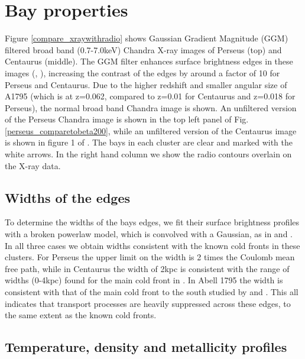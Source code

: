 \documentclass[useAMS,usenatbib]{mn2e}
\begin{document}
\section{Bay properties}
\label{sec:bayproperties}
Figure \ref{compare_xraywithradio} shows Gaussian Gradient
Magnitude (GGM) filtered broad band (0.7-7.0keV) Chandra
X-ray images of Perseus (top) and Centaurus (middle). The GGM filter enhances surface
brightness edges in these images (\citealt{Sanders2016b}, \citealt{Walker2016}), increasing the contrast of the
edges by around a factor of 10 for Perseus and Centaurus. Due to the higher redshift and smaller angular size of A1795 (which is at z=0.062, compared to z=0.01 for Centaurus and z=0.018 for Perseus), the normal broad band Chandra
image is shown. An unfiltered version of the Perseus Chandra image is shown in the top left panel of Fig. \ref{perseus_comparetobeta200}, while an unfiltered version of the
Centaurus image is shown in figure 1 of \citet{Sanders2016}. The bays in each cluster are clear and marked
with the white arrows. In the right hand column we show the radio contours
overlain on the X-ray data. 

\subsection{Widths of the edges}

To determine the widths of the bays edges, we fit their surface brightness profiles with a broken powerlaw
model, which is convolved with a Gaussian, as in \citet{Sanders2016b} and \citet{Walker2016}. In all three cases we obtain
widths consistent with the known cold fronts in these clusters. For Perseus the upper limit on the width is 2 times the Coulomb mean 
free path, while in Centaurus the width of 2kpc is consistent with the range of widths (0-4kpc) found for the main cold front in \citealt{Sanders2016b}. In Abell 1795 the width is consistent with that of the main cold front to the south 
studied by \citet{Markevitch2001} and \citet{Ehlert2015}. This all indicates that transport processes are heavily suppressed across these edges, to the same extent as the known cold fronts. 

\subsection{Temperature, density and metallicity profiles}
\end{document}
